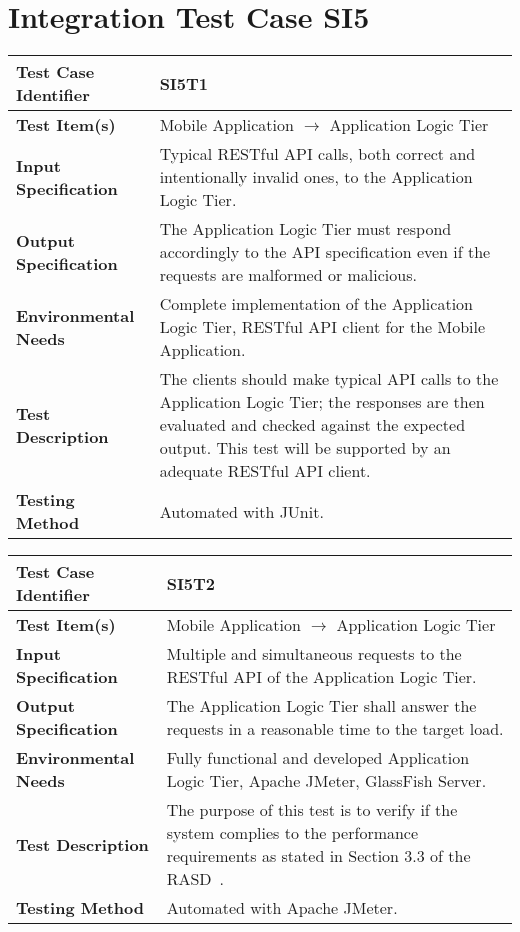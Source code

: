 \section{Integration Test Case SI5}

\begin{longtable}{p{} | p{}}
\hline
\textbf{Test Case Identifier} & SI5T1\\
\hline
\textbf{Test Item(s)} & Mobile Application $\rightarrow$ Application Logic Tier \\
\hline
\textbf{Input Specification} & Typical RESTful API calls, both correct and intentionally invalid ones, to the Application Logic Tier. \\
\hline
\textbf{Output Specification} & The Application Logic Tier must respond accordingly to the API specification even if the requests are malformed or malicious. \\
\hline
\textbf{Environmental Needs} & Complete implementation of the Application Logic Tier, RESTful API client for the Mobile Application. \\
\hline
\textbf{Test Description} & The clients should make typical API calls to the Application Logic Tier; the responses are then evaluated and checked against the expected output. This test will be supported by an adequate RESTful API client. \\
\hline
\textbf{Testing Method} & Automated with JUnit. \\
\hline
\end{longtable}

\begin{longtable}{p{} | p{}}
\hline
\textbf{Test Case Identifier} & SI5T2\\
\hline
\textbf{Test Item(s)} & Mobile Application $\rightarrow$ Application Logic Tier \\
\hline
\textbf{Input Specification} & Multiple and simultaneous requests to the RESTful API of the Application Logic Tier. \\
\hline
\textbf{Output Specification} & The Application Logic Tier shall answer the requests in a reasonable time to the target load. \\
\hline
\textbf{Environmental Needs} & Fully functional and developed Application Logic Tier, Apache JMeter, GlassFish Server. \\
\hline
\textbf{Test Description} & The purpose of this test is to verify if the system complies to the performance requirements as stated in Section 3.3 of the RASD~\cite{rasd}. \\
\hline
\textbf{Testing Method} & Automated with Apache JMeter. \\
\hline
\end{longtable}

